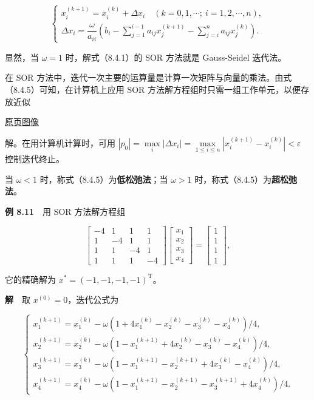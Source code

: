 \documentclass[
  10pt,
  fontset=fandol]{ctexart}
\begin{document}
\[
\begin{cases}
x_i^{(k+1)}=x_i^{(k)}+\Delta x_i\quad(k=0,1,\cdots;\ i=1,2,\cdots,n),\\[5pt]
\Delta x_i=\dfrac{\omega}{a_{ii}}\left(b_i-\displaystyle\sum_{j=1}^{i-1}a_{ij}x_j^{(k+1)}-\displaystyle\sum_{j=i}^n a_{ij}x_j^{(k)}\right).
\end{cases}
\tag{8.4.6}
\]

显然，当 \(\omega=1\) 时，解式（8.4.1）的 SOR 方法就是 Gauss-Seidel 迭代法。

在 SOR 方法中，迭代一次主要的运算量是计算一次矩阵与向量的乘法。由式（8.4.5）可知，在计算机上应用 SOR 方法解方程组时只需一组工作单元，以便存放近似

\href{../../source-images/pdf-227.jpeg}{原页图像}

解。在用计算机计算时，可用 \(|p_0|=\max\limits_i|\Delta x_i|=\max\limits_{1\leqslant i\leqslant n}|x_i^{(k+1)}-x_i^{(k)}|<\varepsilon\) 控制迭代终止。

当 \(\omega<1\) 时，称式（8.4.5）为\textbf{低松弛法}；当 \(\omega>1\) 时，称式（8.4.5）为\textbf{超松弛法}。

\textbf{例 8.11}　用 SOR 方法解方程组

\[
\begin{bmatrix}-4&1&1&1\\1&-4&1&1\\1&1&-4&1\\1&1&1&-4\end{bmatrix}
\begin{bmatrix}x_1\\x_2\\x_3\\x_4\end{bmatrix}
=\begin{bmatrix}1\\1\\1\\1\end{bmatrix},
\]

它的精确解为 \(x^*=(-1,-1,-1,-1)^{\mathrm T}\)。

\textbf{解}　取 \(x^{(0)}=0\)，迭代公式为

\[
\begin{cases}
x_1^{(k+1)}=x_1^{(k)}-\omega(1+4x_1^{(k)}-x_2^{(k)}-x_3^{(k)}-x_4^{(k)})/4,\\
x_2^{(k+1)}=x_2^{(k)}-\omega(1-x_1^{(k+1)}+4x_2^{(k)}-x_3^{(k)}-x_4^{(k)})/4,\\
x_3^{(k+1)}=x_3^{(k)}-\omega(1-x_1^{(k+1)}-x_2^{(k+1)}+4x_3^{(k)}-x_4^{(k)})/4,\\
x_4^{(k+1)}=x_4^{(k)}-\omega(1-x_1^{(k+1)}-x_2^{(k+1)}-x_3^{(k+1)}+4x_4^{(k)})/4.
\end{cases}
\]
\end{document}
